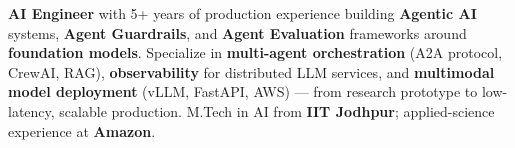 \documentclass[letter,10pt]{article}
\begin{document}

\textbf{AI Engineer} with 5+ years of production experience building \textbf{Agentic AI} systems, \textbf{Agent Guardrails}, and \textbf{Agent Evaluation} frameworks around \textbf{foundation models}.
Specialize in \textbf{multi-agent orchestration} (A2A protocol, CrewAI, RAG), \textbf{observability} for distributed LLM services, and \textbf{multimodal model deployment} (vLLM, FastAPI, AWS) — from research prototype to low-latency, scalable production.
M.Tech in AI from \textbf{IIT Jodhpur}; applied-science experience at \textbf{Amazon}.
\end{document}
